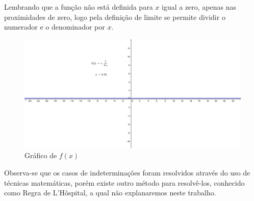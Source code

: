 Lembrando que a função não está definida para $x$ igual a zero, apenas nas proximidades de zero, logo pela definição de limite se permite dividir o numerador e o denominador por $x$.
\begin{figure}[H]
\centering %
\includegraphics[width=15cm]{img/sub2.png} %
\caption{Gráfico de $f(x)$}
\label{fig:graph1}
\end{figure}
\quad Observa-se que os casos de indeterminações foram resolvidos através do uso de técnicas matemáticas, porém existe outro método para resolvê-los, conhecido como Regra de L'Hôspital, a qual não explanaremos neste trabalho. 































 